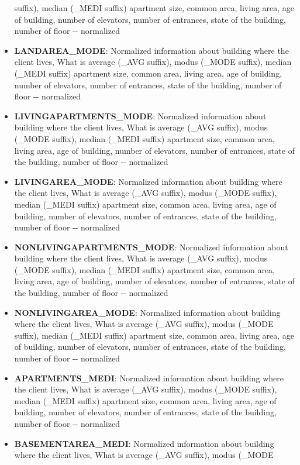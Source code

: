 \documentclass[11pt]{article}
\begin{document}
\begin{itemize}
  suffix), median (\_MEDI suffix) apartment size, common area, living
  area, age of building, number of elevators, number of entrances, state
  of the building, number of floor -\/- normalized
\item
  \textbf{LANDAREA\_MODE}: Normalized information about building where
  the client lives, What is average (\_AVG suffix), modus (\_MODE
  suffix), median (\_MEDI suffix) apartment size, common area, living
  area, age of building, number of elevators, number of entrances, state
  of the building, number of floor -\/- normalized
\item
  \textbf{LIVINGAPARTMENTS\_MODE}: Normalized information about building
  where the client lives, What is average (\_AVG suffix), modus (\_MODE
  suffix), median (\_MEDI suffix) apartment size, common area, living
  area, age of building, number of elevators, number of entrances, state
  of the building, number of floor -\/- normalized
\item
  \textbf{LIVINGAREA\_MODE}: Normalized information about building where
  the client lives, What is average (\_AVG suffix), modus (\_MODE
  suffix), median (\_MEDI suffix) apartment size, common area, living
  area, age of building, number of elevators, number of entrances, state
  of the building, number of floor -\/- normalized
\item
  \textbf{NONLIVINGAPARTMENTS\_MODE}: Normalized information about
  building where the client lives, What is average (\_AVG suffix), modus
  (\_MODE suffix), median (\_MEDI suffix) apartment size, common area,
  living area, age of building, number of elevators, number of
  entrances, state of the building, number of floor -\/- normalized
\item
  \textbf{NONLIVINGAREA\_MODE}: Normalized information about building
  where the client lives, What is average (\_AVG suffix), modus (\_MODE
  suffix), median (\_MEDI suffix) apartment size, common area, living
  area, age of building, number of elevators, number of entrances, state
  of the building, number of floor -\/- normalized
\item
  \textbf{APARTMENTS\_MEDI}: Normalized information about building where
  the client lives, What is average (\_AVG suffix), modus (\_MODE
  suffix), median (\_MEDI suffix) apartment size, common area, living
  area, age of building, number of elevators, number of entrances, state
  of the building, number of floor -\/- normalized
\item
  \textbf{BASEMENTAREA\_MEDI}: Normalized information about building
  where the client lives, What is average (\_AVG suffix), modus (\_MODE

\end{itemize}
\end{document}
